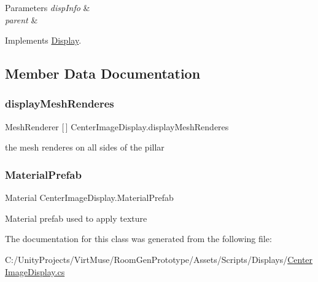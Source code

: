\begin{DoxyParams}{Parameters}
{\em disp\+Info} & \\
\hline
{\em parent} & \\
\hline
\end{DoxyParams}


Implements \mbox{\hyperlink{class_display_a57325251fbeac943cd48520e50f0bec4}{Display}}.



\subsection{Member Data Documentation}
\mbox{\label{class_center_image_display_a47f09ee02109c10416288b5022f193f8}} 
\subsubsection{\texorpdfstring{display\+Mesh\+Renderes}{displayMeshRenderes}}
{\footnotesize\ttfamily Mesh\+Renderer \mbox{[}$\,$\mbox{]} Center\+Image\+Display.\+display\+Mesh\+Renderes\hspace{0.3cm}{\ttfamily [private]}}



the mesh renderes on all sides of the pillar 

\mbox{\label{class_center_image_display_af22091d70f8772c7263ad852e3770619}} 
\subsubsection{\texorpdfstring{Material\+Prefab}{MaterialPrefab}}
{\footnotesize\ttfamily Material Center\+Image\+Display.\+Material\+Prefab\hspace{0.3cm}{\ttfamily [private]}}



Material prefab used to apply texture 



The documentation for this class was generated from the following file\+:\begin{DoxyCompactItemize}
\item 
C\+:/\+Unity\+Projects/\+Virt\+Muse/\+Room\+Gen\+Prototype/\+Assets/\+Scripts/\+Displays/\mbox{\hyperlink{_center_image_display_8cs}{Center\+Image\+Display.\+cs}}\end{DoxyCompactItemize}
